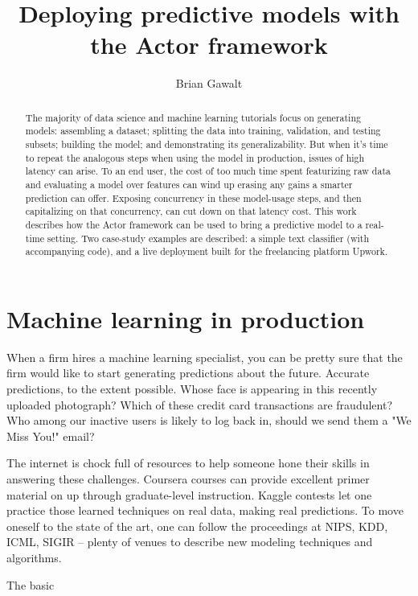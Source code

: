 \documentclass{article}
\begin{document}
\title{Deploying predictive models with the Actor framework}
\author{Brian Gawalt}

\maketitle


\begin{abstract}
The majority of data science and machine learning tutorials focus on generating models: assembling a dataset; splitting the data into training, validation, and testing subsets; building the model; and demonstrating its generalizability. But when it's time to repeat the analogous steps when using the model in production, issues of high latency can arise. To an end user, the cost of too much time spent featurizing raw data and evaluating a model over features can wind up erasing any gains a smarter prediction can offer. Exposing concurrency in these model-usage steps, and then capitalizing on that concurrency, can cut down on that latency cost. This work describes how the Actor framework can be used to bring a predictive model to a real-time setting. Two case-study examples are described: a simple text classifier (with accompanying code), and a live deployment built for the freelancing platform Upwork.
\end{abstract}

\section{Machine learning in production}
When a firm hires a machine learning specialist, you can be pretty sure that the firm would like to start generating predictions about the future. Accurate predictions, to the extent possible. Whose face is appearing in this recently uploaded photograph? Which of these credit card transactions are fraudulent? Who among our inactive users is likely to log back in, should we send them a "We Miss You!" email?

The internet is chock full of resources to help someone hone their skills in answering these challenges. Coursera courses can provide excellent primer material on up through graduate-level instruction.  Kaggle contests let one practice those learned techniques on real data, making real predictions. To move oneself to the state of the art, one can follow the proceedings at NIPS, KDD, ICML, SIGIR -- plenty of venues to describe new modeling techniques and algorithms.

The basic 
\end{document}
